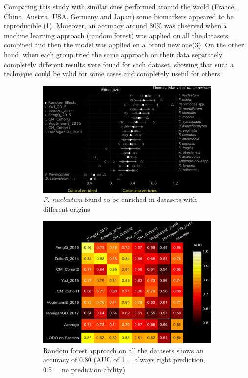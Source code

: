 Comparing this study with similar ones performed around the world (France, China, Austria, USA, Germany and Japan) some biomarkers appeared to be reproducible (\ref{fig:biomarkers}). Moreover, an accuracy around 80\% was observed when a machine learning approach (random forest) was applied on all the datasets combined and then the model was applied on a brand new one(\ref{fig:ML}). On the other hand, when each group tried the same approach on their data separately, completely different results were found for each dataset, showing that such a technique could be valid for some cases and completely useful for others. 

\begin{figure}[!h]
\centering
\begin{subfigure}{.45\textwidth}
    \centering
    \includegraphics[width=\linewidth]{CRCbiomarkers.png}
    \caption{\label{fig:biomarkers} \emph{F. nucleatum} found to be enriched in datasets with different origins}
\end{subfigure}
%
\begin{subfigure}{.45\textwidth}
    \centering
    \includegraphics[width=\linewidth]{CRC_ML.png}
    \caption{\label{fig:ML}Random forest approach on all the datasets shows an accuracy of 0.80 (AUC of 1 = always right prediction, 0.5 = no prediction ability)}
\end{subfigure}
\caption{}
\end{figure}


